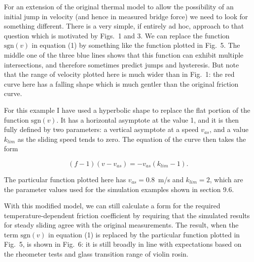   For an extension of the original thermal model to allow the possibility of an 
  initial jump in velocity (and hence in measured bridge force) we need to look 
  for something different. There is a very simple, if entirely ad hoc, approach 
  to that question which is motivated by Figs.\ 1 and 3. We can replace the 
  function $\mathrm{sgn}(v)$ in equation (1) by something like the function 
  plotted in Fig.\ 5. The middle one of the three blue lines shows that this 
  function can exhibit multiple intersections, and therefore sometimes predict 
  jumps and hysteresis. But note that the range of velocity plotted here is 
  much wider than in Fig.\ 1: the red curve here has a falling shape which is 
  much gentler than the original friction curve. 


  For this example I have used a hyperbolic shape to replace the flat portion 
  of the function $\mathrm{sgn}(v)$. It has a horizontal asymptote at the value 
  1, and it is then fully defined by two parameters: a vertical asymptote at a 
  speed $v_{as}$, and a value $k_{lim}$ as the sliding speed tends to zero. The 
  equation of the curve then takes the form 

  \begin{equation*}(f-1)(v-v_{as})=-v_{as} (k_{lim}-1) . \tag{3}\end{equation*} 

  The particular function plotted here has $v_{as}=0.8$ m/s and $k_{lim}=2$, 
  which are the parameter values used for the simulation examples shown in 
  section 9.6. 

  With this modified model, we can still calculate a form for the required 
  temperature-dependent friction coefficient by requiring that the simulated 
  results for steady sliding agree with the original measurements. The result, 
  when the term $\mathrm{sgn}(v)$ in equation (1) is replaced by the particular 
  function plotted in Fig.\ 5, is shown in Fig.\ 6: it is still broadly in line 
  with expectations based on the rheometer tests and glass transition range of 
  violin rosin. 

